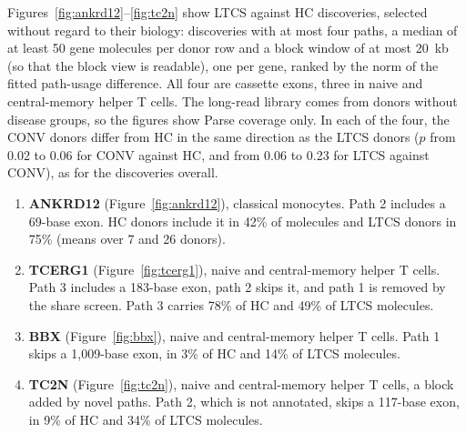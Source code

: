 \documentclass[11pt]{article}
\begin{document}
Figures~\ref{fig:ankrd12}--\ref{fig:tc2n} show LTCS against HC discoveries, selected without regard to their biology: discoveries with at most four paths, a median of at least 50 gene molecules per donor row and a block window of at most 20~kb (so that the block view is readable), one per gene, ranked by the norm of the fitted path-usage difference. All four are cassette exons, three in naive and central-memory helper T cells. The long-read library comes from donors without disease groups, so the figures show Parse coverage only. In each of the four, the CONV donors differ from HC in the same direction as the LTCS donors ($p$ from 0.02 to 0.06 for CONV against HC, and from 0.06 to 0.23 for LTCS against CONV), as for the discoveries overall.
\begin{enumerate}[leftmargin=*]
  \item \textbf{ANKRD12} (Figure~\ref{fig:ankrd12}), classical monocytes. Path 2 includes a 69-base exon. HC donors include it in 42\% of molecules and LTCS donors in 75\% (means over 7 and 26 donors).
  \item \textbf{TCERG1} (Figure~\ref{fig:tcerg1}), naive and central-memory helper T cells. Path 3 includes a 183-base exon, path 2 skips it, and path 1 is removed by the share screen. Path 3 carries 78\% of HC and 49\% of LTCS molecules.
  \item \textbf{BBX} (Figure~\ref{fig:bbx}), naive and central-memory helper T cells. Path 1 skips a 1{,}009-base exon, in 3\% of HC and 14\% of LTCS molecules.
  \item \textbf{TC2N} (Figure~\ref{fig:tc2n}), naive and central-memory helper T cells, a block added by novel paths. Path 2, which is not annotated, skips a 117-base exon, in 9\% of HC and 34\% of LTCS molecules.
\end{enumerate}
\end{document}
